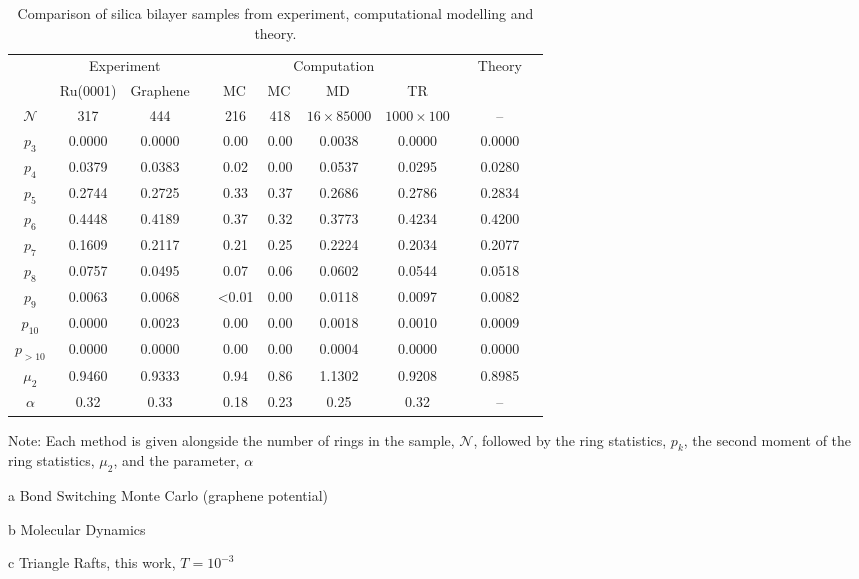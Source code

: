 \begin{landscape}
\begin{table}
\centering
\caption{Comparison of silica bilayer samples from experiment, computational modelling and theory.}
\label{tab:trpk}
\begin{threeparttable}
\begin{tabular}{@{}ccccccccccc@{}}
\toprule
& \multicolumn{2}{c}{Experiment} & \phantom{xxx} & \multicolumn{4}{c}{Computation} & \phantom{xxx} & \multicolumn{1}{c}{Theory} \\ 
\cmidrule{2-3} \cmidrule{5-8} \cmidrule{10-10}
& Ru(0001) \cite{Buchner2016a} & Graphene \cite{Huang2012} & & MC\tnote{a}\, \cite{Kumar2014} & MC\tnote{a}\, \cite{Kumar2014} & MD\tnote{b}\, \cite{Roy2018} & TR\tnote{c} & & \lm{} \cite{Gervois1992}  \\ 
\midrule
$\mathcal{N}$ & 317    & 444    &&    216 & 418      & $16 \times 85000$ & $1000 \times 100$ && \--- \\ 
$p_3$  &0.0000 & 0.0000 && 0.00 & 0.00     & 0.0038            & 0.0000 && 0.0000 \\ 
$p_4$  &0.0379 & 0.0383 && 0.02   & 0.00     & 0.0537            & 0.0295 && 0.0280 \\  
$p_5$  &0.2744 & 0.2725 && 0.33   & 0.37     & 0.2686            & 0.2786 && 0.2834 \\
$p_6$  &0.4448 & 0.4189 && 0.37   & 0.32     & 0.3773            & 0.4234 &&  0.4200 \\  
$p_7$  &0.1609 & 0.2117 && 0.21   & 0.25     & 0.2224            & 0.2034 && 0.2077 \\  
$p_8$  &0.0757 & 0.0495 && 0.07   & 0.06     & 0.0602            & 0.0544 && 0.0518 \\ 
$p_9$  &0.0063 & 0.0068 && <0.01  & 0.00     & 0.0118            & 0.0097 && 0.0082 \\
$p_{10}$  &0.0000 & 0.0023 && 0.00 & 0.00  & 0.0018            & 0.0010 && 0.0009 \\
$p_{>10}$  &0.0000 & 0.0000 && 0.00 & 0.00 & 0.0004            & 0.0000 && 0.0000 \\ 
$\mu_2$ &  0.9460 & 0.9333 &&  0.94 & 0.86 & 1.1302 & 0.9208 && 0.8985 \\ 
$\alpha$  &0.32   & 0.33 && 0.18 & 0.23 & 0.25 & 0.32 && \--- \\
\bottomrule
\end{tabular}
\begin{tablenotes}
  Note: Each method is given alongside the number of rings in the sample, $\mathcal{N}$, followed by the ring statistics, $p_k$, the second moment of the ring statistics, $\mu_2$, and the \aw{} parameter, $\alpha$ \\
  \item[a] Bond Switching Monte Carlo (graphene potential)
  \item[b] Molecular Dynamics
  \item[c] Triangle Rafts, this work, $T=10^{-3}$
\end{tablenotes}
\end{threeparttable}
\end{table}
\end{landscape}

